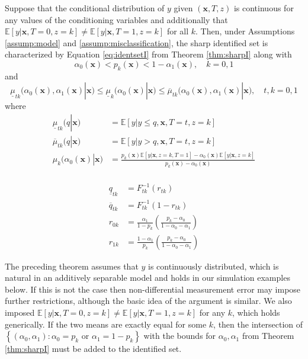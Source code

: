 \begin{thm}
  \label{thm:sharpII}
  Suppose that the conditional distribution of $y$ given $(\mathbf{x}, T,z)$ is continuous for any values of the conditioning variables and additionally  that $\mathbb{E}\left[ y|\mathbf{x},T=0,z=k \right] \neq \mathbb{E}\left[ y|\mathbf{x},T=1,z=k \right]$ for all $k$.
  Then, under Assumptions \ref{assump:model} and \ref{assump:misclassification}, the sharp identified set is characterized by Equation \ref{eq:identsetI} from Theorem \ref{thm:sharpI} along with 
\[
  \alpha_0(\mathbf{x}) < p_k(\mathbf{x}) < 1 -  \alpha_1(\mathbf{x}), \quad k = 0, 1
\]
and
\[
  \underline{\mu}_{tk}\big( \alpha_0(\mathbf{x}), \alpha_1(\mathbf{x})\left.\right|\mathbf{x} \big)\leq 
  \underline{\mu}_{k}\big( \alpha_0(\mathbf{x})\left.\right|\mathbf{x} \big)\leq 
  \overline{\mu}_{tk}\big( \alpha_0(\mathbf{x}), \alpha_1(\mathbf{x})\left.\right|\mathbf{x} \big), \quad t,k=0,1 
\]
where
\begin{align*}
  \underline{\mu}_{tk}\big( q\left.\right|\mathbf{x} \big) &= \mathbb{E}\left[ y\left|\right.y\leq q, \mathbf{x},T=t, z=k\right] \\
  \overline{\mu}_{tk}\big(q \left.\right|\mathbf{x} \big) &= \mathbb{E}\left[ y\left|\right. y > q, \mathbf{x}, T=t, z=k\right]\\
  \mu_k\big(\alpha_0(\mathbf{x}) \left.\right|\mathbf{x}\big) &= 
  \frac{p_k(\mathbf{x}) \mathbb{E}[y|\mathbf{x},z=k,T=1] - \alpha_0(\mathbf{x}) \mathbb{E}[y|\mathbf{x},z=k]}{p_k(\mathbf{x}) - \alpha_0(\mathbf{x})}\\
\end{align*}

\begin{align*}
  \underline{q}_{tk} &= F^{-1}_{tk}(r_{tk})\\
  \overline{q}_{tk} &= F^{-1}_{tk}(1 - r_{tk})\\
  r_{0k} &= \frac{\alpha_1}{1 - p_k} \left( \frac{p_k - \alpha_0}{1 - \alpha_0 - \alpha_1} \right)\\
  r_{1k} &= \frac{1 - \alpha_1}{p_k} \left( \frac{p_k - \alpha_0}{1 - \alpha_0 - \alpha_1} \right)
\end{align*}
\end{thm}


The preceding theorem assumes that $y$ is continuously distributed, which is natural in an additively separable model and holds in our simulation examples below. 
If this is not the case then non-differential measurement error may impose further restrictions, although the basic idea of the argument is similar.
We also imposed $\mathbb{E}[y|\mathbf{x},T = 0, z=k] \neq \mathbb{E}[y|\mathbf{x},T=1, z=k]$ for any $k$, which holds generically.
If the two means are exactly equal for some $k$, then the intersection of $\left\{ (\alpha_0, \alpha_1)\colon \alpha_0 = p_k \mbox{ or } \alpha_1 = 1-p_k \right\}$ with the bounds for $\alpha_0, \alpha_1$ from Theorem \ref{thm:sharpI} must be added to the identified set.

